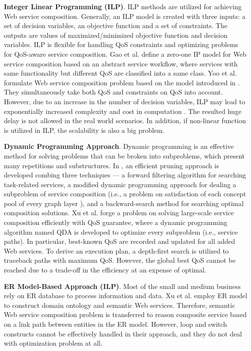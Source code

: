 \textbf{Integer Linear Programming (ILP)}. ILP methods are utilized for achieving Web service composition. Generally, an ILP model is created with three inputs: a set of decision variables, an objective function and a set of constraints. The outputs are values of maximized/minimized objective function and decision variables. ILP is flexible for handling QoS  constraints and optimizing problems for QoS-aware service composition. Gao et al. \cite{gao2005web} define a zero-one IP model for Web service composition based on an abstract service workflow, where services with same functionality but different QoS are classified into a same class. Yoo et al. \cite{yoo2008web} formulate Web service composition problem based on the model introduced in \cite{gao2005web}. They simultaneously take both QoS and constraints on QoS into account. However, due to an increase in the number of decision variables, ILP may lead to exponentially increased complexity and cost in computation \cite{li2016full}. The resulted huge delay is not allowed in the real world scenarios. In addition, if non-linear function is utilized in ILP, the scalability is also a big problem.
 
\textbf{Dynamic Programming Approach}. Dynamic programming is an effective method for solving problems that can be broken into subproblems, which present many repetitions and substructures. In  \cite{huang2009effective}, an efficient pruning approach is developed combing three techniques --- a forward filtering algorithm for searching task-related services, a modified dynamic programming approach for dealing a subproblem of service composition (i.e., a problem on satisfaction of each concept pool of every graph layer ), and a backward-search method for searching optimal composition solutions. Xu et al. \cite{xu2012towards} forge a problem on solving large-scale service composition efficiently with QoS guarantee, where a dynamic programming algorithm named QDA is developed to optimize every subproblem (i.e., service paths). In particular, best-known QoS are recorded and updated for all added Web services. To derive an execution plan, a depth-first search is utilized to traceback paths with maximum QoS. However, the global best QoS cannot be reached due to a trade-off in the efficiency at an expense of optimal.

\textbf{ER Model-Based Approach (ILP)}. Most of the small and medium business rely on ER database to process information and data. Xu et al. \cite{xu2010semantic} employ ER model to construct domain ontology and semantic Web services. Therefore, semantic Web service composition problem is transferred to reason composite service based on a link path between entities in the ER model. However, loop and switch constructs cannot be effectively handled in their approach, and they do not deal with optimization problem at all.


